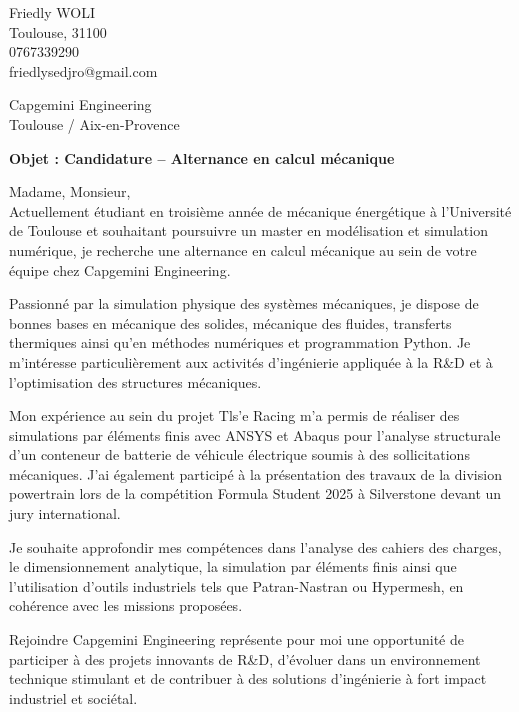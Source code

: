 \documentclass[11pt,a4paper]{article}
\begin{document}
	\pagestyle{empty}
	
	\noindent
	Friedly WOLI \\
	Toulouse, 31100 \\
	0767339290 \\
	friedlysedjro@gmail.com
	
	\begin{flushright}
		Capgemini Engineering \\
		Toulouse / Aix-en-Provence
	\end{flushright}
	
	\bigskip
	
	\textbf{Objet : Candidature – Alternance en calcul mécanique} \\
	
	\bigskip
	
	Madame, Monsieur, \\
	
	Actuellement étudiant en troisième année de mécanique énergétique à l’Université de Toulouse et souhaitant poursuivre un master en modélisation et simulation numérique, je recherche une alternance en calcul mécanique au sein de votre équipe chez Capgemini Engineering.
	
	Passionné par la simulation physique des systèmes mécaniques, je dispose de bonnes bases en mécanique des solides, mécanique des fluides, transferts thermiques ainsi qu’en méthodes numériques et programmation Python. Je m’intéresse particulièrement aux activités d’ingénierie appliquée à la R\&D et à l’optimisation des structures mécaniques.
	
	Mon expérience au sein du projet Tls’e Racing m’a permis de réaliser des simulations par éléments finis avec ANSYS et Abaqus pour l’analyse structurale d’un conteneur de batterie de véhicule électrique soumis à des sollicitations mécaniques. J’ai également participé à la présentation des travaux de la division powertrain lors de la compétition Formula Student 2025 à Silverstone devant un jury international.
	
	Je souhaite approfondir mes compétences dans l’analyse des cahiers des charges, le dimensionnement analytique, la simulation par éléments finis ainsi que l’utilisation d’outils industriels tels que Patran-Nastran ou Hypermesh, en cohérence avec les missions proposées.
	
	Rejoindre Capgemini Engineering représente pour moi une opportunité de participer à des projets innovants de R\&D, d’évoluer dans un environnement technique stimulant et de contribuer à des solutions d’ingénierie à fort impact industriel et sociétal.
	
\end{document}
